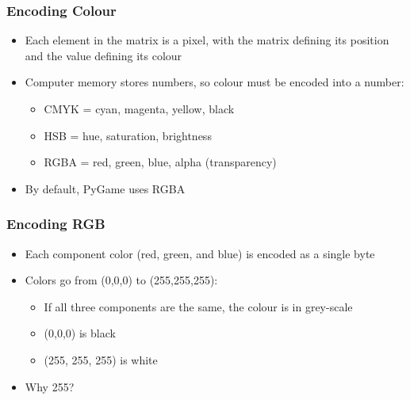 \begin{frame}
	\frametitle{Encoding Colour}
	
	\begin{itemize}
		\item Each element in the matrix is a pixel, with the matrix defining its position and the value defining  its colour
		\item Computer memory stores numbers, so colour must be encoded into a number:
		\begin{itemize}
			\item CMYK = cyan, magenta, yellow, black
			\item HSB = hue, saturation, brightness
			\item RGBA = red, green, blue, alpha (transparency)
		\end{itemize}
		\item By default, PyGame uses RGBA
	\end{itemize}
\end{frame}

\begin{frame}
	\frametitle{Encoding RGB}
	
	\begin{itemize}
		\item Each component color (red, green, and blue) is encoded as a single byte
		\item Colors go from (0,0,0) to (255,255,255):
		\begin{itemize}
			\item If all three components are the same, the colour is in grey-scale
			\item (0,0,0) is black
			\item (255, 255, 255) is white
		\end{itemize}
		\item Why 255?
	\end{itemize}
\end{frame}


